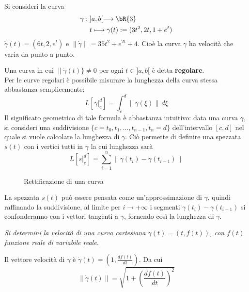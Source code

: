 \begin{example}
  Si consideri la curva
  \[\begin{aligned}
    \gamma: & \; ]a,b[ \longrightarrow \bR{3}\\
    &\;  t\longmapsto \gamma(t):= (3t^2,2t,1+e^t)
  \end{aligned}\]  
  $\dot\gamma(t) = (6t,2,e^t)$ e $\|\dot\gamma\| = 35t^2+e^{2t}+4$.
  Cio\`e la curva $\gamma$ ha velocit\`a che varia da punto a punto.
\end{example}
Una curva in cui $\|\dot\gamma(t)\}\ne0$ per ogni $t\in]a,b[$ \`e detta {\bf 
regolare}.\\
Per le curve regolari \`e possibile misurare la lunghezza della curva stessa 
abbastanza
semplicemente:
\[
  L[\gamma|^d_c] = \int_c^d \|\gamma(\xi)\| \, d\xi
\]
Il significato geometrico di tale formula \`e abbastanza intuitivo: data una 
curva $\gamma$,
si consideri una suddivisione $\{c=t_0,t_1,\ldots,t_{n-1},t_n=d\}$ 
dell'intervallo $[c,d]$ nel quale si vuole calcolare la lunghezza 
di $\gamma$. Ci\`o permette di definire una spezzata $s(t)$ con i vertici tutti 
in $\gamma$
la cui lunghezza sar\`a
\[
  L[s|_c^d] = \sum_{i=1}^n \| \gamma(t_i)-\gamma(t_{i-1}) \|
\]

\begin{figure}[h!]
\begin{center}
{\small
{}
}
\caption{\small Rettificazione di una curva}\label{fig:???}
\end{center}
\end{figure}

La spezzata $s(t)$ pu\`o essere pensata come un'approssimazione di $\gamma$, 
quindi 
raffinando la suddivisione, al limite per $i\longrightarrow +\infty$ i segmenti 
$\gamma(t_i)-\gamma(t_{i-1})$ si confonderanno con i vettori tangenti a 
$\gamma$, 
fornendo cos\`{i} la lunghezza di $\gamma$.

\begin{example}
  {\it Si determini la velocit\`a di una curva cartesiana $\gamma(t) = 
(t,f(t))$, con $f(t)$
  funzione reale di variabile reale.}
\end{example}
\begin{sol}
  Il vettore velocit\`a di $\gamma$ \`e $\dot \gamma(t) = \left(1, 
\frac{df(t)}{dt}\right)$. Da cui
  \[
    \|\dot\gamma(t) \| =\sqrt{1+\left(\frac{df(t)}{dt}\right)^2}
  \]
\end{sol}

